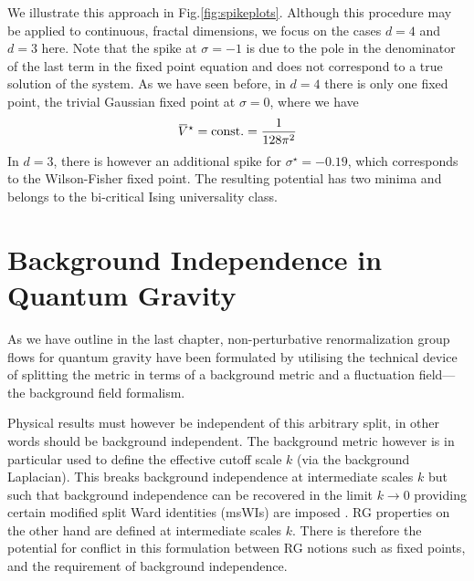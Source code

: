 \documentclass[11pt]{book}
\newcommand{\overbar}[1]{\mkern 1.5mu\overline{\mkern-1.5mu#1\mkern-1.5mu}\mkern 1.5mu}
\newcommand{\bV}{\overbar V}
\numberwithin{equation}{chapter}
\begin{document}
We illustrate this approach in Fig.\ref{fig:spikeplots}.
Although this procedure may be applied to continuous, fractal dimensions, we focus
on the cases $d=4$ and $d=3$ here. Note that the spike at $\sigma = -1$ is due
to the pole in the denominator of the last term in the fixed point equation and
does not correspond to a true solution of the system.
As we have seen before, in $d=4$ there is only one fixed point, the trivial
Gaussian fixed point at $\sigma = 0$, where we have
\begin{align}
  \bV^\star = \mathrm{const.} = \frac { 1 }{ 128 \pi^2 }
\end{align}
In $d=3$, there is however an additional spike for $\sigma^\star = -0.19$,
which corresponds to the Wilson-Fisher fixed point. The resulting potential
has two minima and belongs to the bi-critical Ising universality class.



\chapter{Background Independence in Quantum Gravity}

\label{ch:tim}

As we have outline in the last chapter,
non-perturbative renormalization group flows for quantum gravity \cite{Reuter:1996cp}
have been formulated by utilising the technical device of splitting the metric in terms
of a background metric and a fluctuation field---the background field formalism.

Physical results must however be independent of this arbitrary split,
in other words should be background independent.
The background metric however is in particular used
to define the effective cutoff scale $k$ (via the background Laplacian).
This breaks background independence at intermediate scales $k$ but such that background
independence can be recovered in the limit $k\to0$ providing certain modified split Ward
identities (msWIs) are imposed
\cite{Pawlowski:2005xe, Litim:2002hj, Bridle:2013sra, Reuter:1997gx, Litim:1998nf, Litim:2002ce,
Manrique:2009uh, Manrique:2010mq, Manrique:2010am, Dietz:2015owa, Safari:2015dva}.
RG properties on the other hand are defined at intermediate scales $k$.
There is therefore the potential for conflict in this formulation between RG notions such as fixed points,
and the requirement of background independence.
\end{document}
